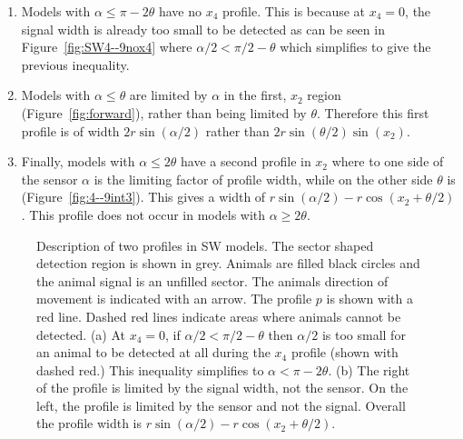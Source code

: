\begin{enumerate}
\item Models with $\alpha \le \pi - 2\theta$  have no $x_4$ profile.
This is because at $x_4 = 0$, the signal width is already too small to be detected as can be seen in Figure~\ref{fig:SW4--9nox4} where $\alpha/2 < \pi/2 - \theta$ which simplifies to give the previous inequality.

\item Models with $\alpha \le \theta$ are limited by $\alpha$ in the first, $x_2$ region (Figure~\ref{fig:forward}), rather than being limited by $\theta$.
Therefore this first profile is of width $2r\sin(\alpha/2)$ rather than $2r\sin(\theta/2)\sin(x_2)$.

\item Finally, models with $\alpha \le 2\theta$ have a second profile in $x_2$ where to one side of the sensor $\alpha$ is the limiting factor of profile width, while on the other side $\theta$ is (Figure~\ref{fig:4--9int3}).
This gives a width of $r\sin(\alpha/2) - r\cos(x_2 + \theta/2)$.
This profile does not occur in models with $\alpha \ge 2\theta$.

\end{enumerate}

\begin{figure}[t]
 \centering
{
}
\caption[Description of two profiles in SW models]{
Description of two profiles in SW models.
The sector shaped detection region is shown in grey.
Animals are filled black circles and the animal signal is an unfilled sector.
The animals direction of movement is indicated with an arrow.
The profile $p$ is shown with a red line.
Dashed red lines indicate areas where animals cannot be detected.
(a) At $x_4 = 0$, if $\alpha/2 < \pi/2 - \theta$ then $\alpha/2$ is too small for an animal to be detected at all during the $x_4$ profile (shown with dashed red.)
This inequality simplifies to $\alpha < \pi - 2\theta$.
(b) The right of the profile is limited by the signal width, not the sensor.
On the left, the profile is limited by the sensor and not the signal.
Overall the profile width is $r\sin(\alpha/2) - r\cos(x_2 + \theta/2)$.
}
\label{fig:SW4--9}
\end{figure}

